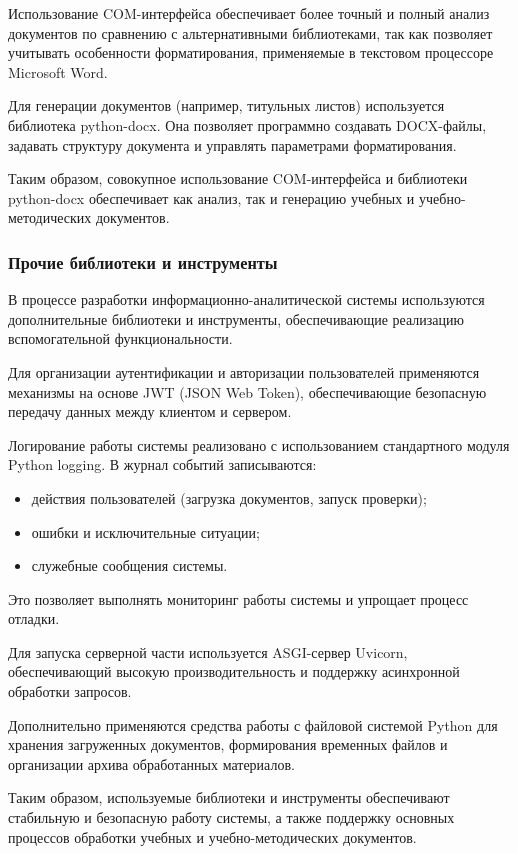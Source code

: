 Использование COM-интерфейса обеспечивает более точный и полный анализ документов по сравнению с альтернативными библиотеками, так как позволяет учитывать особенности форматирования, применяемые в текстовом процессоре Microsoft Word.

Для генерации документов (например, титульных листов) используется библиотека python-docx. Она позволяет программно создавать DOCX-файлы, задавать структуру документа и управлять параметрами форматирования.

Таким образом, совокупное использование COM-интерфейса и библиотеки python-docx обеспечивает как анализ, так и генерацию учебных и учебно-методических документов.

\subsubsection{Прочие библиотеки и инструменты}

В процессе разработки информационно-аналитической системы используются дополнительные библиотеки и инструменты, обеспечивающие реализацию вспомогательной функциональности.

Для организации аутентификации и авторизации пользователей применяются механизмы на основе JWT (JSON Web Token), обеспечивающие безопасную передачу данных между клиентом и сервером.

Логирование работы системы реализовано с использованием стандартного модуля Python logging. В журнал событий записываются:
\begin{itemize}
	\item действия пользователей (загрузка документов, запуск проверки);
	\item ошибки и исключительные ситуации;
	\item служебные сообщения системы.
\end{itemize}

Это позволяет выполнять мониторинг работы системы и упрощает процесс отладки.

Для запуска серверной части используется ASGI-сервер Uvicorn, обеспечивающий высокую производительность и поддержку асинхронной обработки запросов.

Дополнительно применяются средства работы с файловой системой Python для хранения загруженных документов, формирования временных файлов и организации архива обработанных материалов.

Таким образом, используемые библиотеки и инструменты обеспечивают стабильную и безопасную работу системы, а также поддержку основных процессов обработки учебных и учебно-методических документов.

